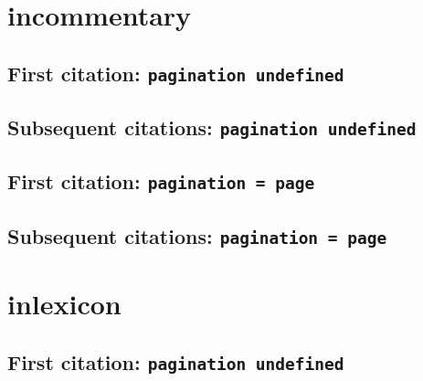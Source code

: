 \documentclass[a4paper]{article}
\begin{document}
\cite{freedman:1980:a}

\cite[14]{freedman:1980:a}

\cite[note]{freedman:1980:a}

\section{incommentary}

\subsection{First citation: \texttt{pagination undefined}}

\cite{miller:2001}

\citereset
\cite[577]{miller:2001}

\citereset
\cite[note]{miller:2001}

\subsection{Subsequent citations: \texttt{pagination undefined}}

\cite{miller:2001}

\cite[577]{miller:2001}

\cite[note]{miller:2001}

\subsection{First citation: \texttt{pagination = page}}

\cite{miller:2001:a}

\citereset
\cite[577]{miller:2001:a}

\citereset
\cite[note]{miller:2001:a}

\subsection{Subsequent citations: \texttt{pagination = page}}

\cite{miller:2001:a}

\cite[577]{miller:2001:a}

\cite[note]{miller:2001:a}

\section{inlexicon}

\subsection{First citation: \texttt{pagination undefined}}
\end{document}
